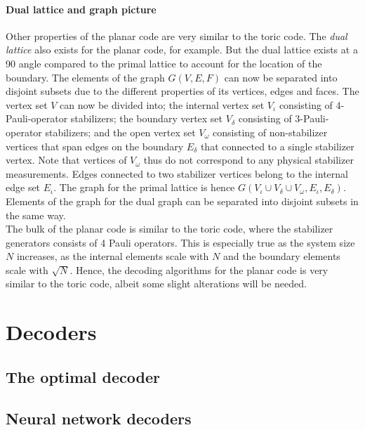 \paragraph{Dual lattice and graph picture}
Other properties of the planar code are very similar to the toric code. The \emph{dual lattice} also exists for the planar code, for example. But the dual lattice exists at a 90 angle compared to the primal lattice to account for the location of the boundary. The elements of the graph $G(V,E,F)$ can now be separated into disjoint subsets due to the different properties of its vertices, edges and faces. The vertex set $V$ can now be divided into; the internal vertex set $V_\iota$ consisting of 4-Pauli-operator stabilizers; the boundary vertex set $V_{\delta}$ consisting of 3-Pauli-operator stabilizers; and the open vertex set $V_\omega$ consisting of non-stabilizer vertices that span edges on the boundary $E_{\delta}$ that connected to a single stabilizer vertex. Note that vertices of $V_\omega$ thus do not correspond to any physical stabilizer measurements. Edges connected to two stabilizer vertices belong to the internal edge set $E_\iota$. The graph for the primal lattice is hence $G(V_\iota\cup V_\delta \cup V_\omega, E_\iota, E_\delta)$. Elements of the graph for the dual graph can be separated into disjoint subsets in the same way.\\

The bulk of the planar code is similar to the toric code, where the stabilizer generators consists of 4 Pauli operators. This is especially true as the system size $N$ increases, as the internal elements scale with $N$ and the boundary elements scale with $\sqrt{N}$. Hence, the decoding algorithms for the planar code is very similar to the toric code, albeit some slight alterations will be needed. 


\section{Decoders}\label{sec:surface_decoders}

\subsection{The optimal decoder}\label{sec:optimal_decoder}

\subsection{Neural network decoders}